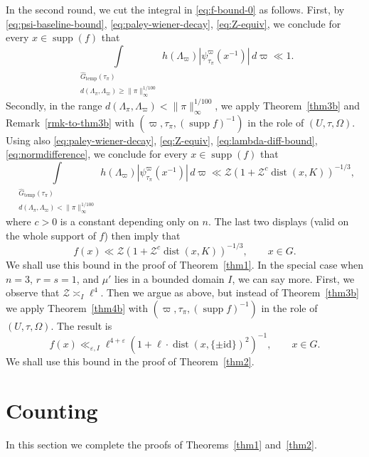 \documentclass[11pt,oneside]{amsart}
\numberwithin{equation}{section}
\theoremstyle{remark}
\theoremstyle{plain}
\DeclareMathOperator{\dist}{dist}
\DeclareMathOperator{\supp}{supp}
\newcommand\id{\mathrm{id}}
\newcommand{\mcZ}{\mathcal{Z}}
\newcommand\eps{\varepsilon}
\renewcommand\geq{\geqslant}
\newcommand\Gtemp{\widehat{G}_\mathrm{temp}}
\begin{document}
In the second round, we cut the integral in \eqref{eq:f-bound-0} as follows. First, by \eqref{eq:psi-baseline-bound}, \eqref{eq:paley-wiener-decay}, \eqref{eq:Z-equiv}, we conclude for every $x\in\supp(f)$ that
\[
\int\limits_{\substack{\Gtemp(\tau_{\pi}) \\ d(\Lambda_{\pi},\Lambda_{\varpi}) \geq \|\pi\|_{\infty}^{1/100}}} h(\Lambda_{\varpi}) |\psi_{\tau_{\pi}}^{\varpi}(x^{-1})| \,d\varpi\ll 1.
\]
Secondly, in the range $d(\Lambda_{\pi},\Lambda_{\varpi}) < \|\pi\|_{\infty}^{1/100}$, we apply Theorem~\ref{thm3b} and Remark~\ref{rmk-to-thm3b} with $(\varpi,\tau_\pi,(\supp f)^{-1})$ in the role of $(U,\tau,\Omega)$. Using also \eqref{eq:paley-wiener-decay}, \eqref{eq:Z-equiv}, \eqref{eq:lambda-diff-bound}, \eqref{eq:normdifference}, we conclude for every $x\in\supp(f)$ that
\[
\int\limits_{\substack{\Gtemp(\tau_{\pi}) \\ d(\Lambda_{\pi},\Lambda_{\varpi}) < \|\pi\|_{\infty}^{1/100}}} h(\Lambda_{\varpi}) |\psi_{\tau_{\pi}}^{\varpi}(x^{-1})| \,d\varpi \ll \mcZ(1+\mcZ^c \dist(x,K))^{-1/3},
\]
where $c>0$ is a constant depending only on $n$. The last two displays (valid on the whole support of $f$) then imply that
\begin{equation}\label{eq:f-decay}
f(x)\ll \mcZ \left(1+\mcZ^{c}\dist(x,K)\right)^{-1/3},\qquad x\in G.
\end{equation}
We shall use this bound in the proof of Theorem~\ref{thm1}. In the special case when $n=3$, $r=s=1$, and $\mu'$ lies in a bounded domain $I$, we can say more. First, we observe that $\mcZ\asymp_I \ell^4$. Then we argue as above, but instead of Theorem~\ref{thm3b} we apply Theorem~\ref{thm4b} with $(\varpi,\tau_\pi,(\supp f)^{-1})$ in the role of $(U,\tau,\Omega)$. The result is
\begin{equation}\label{eq:f-decay-2}
f(x) \ll_{\eps,I} \ell^{4+\eps} (1 + \ell \cdot \dist(x, \{\pm \id\})^2 )^{-1}, \qquad x\in G.
\end{equation}
We shall use this bound in the proof of Theorem~\ref{thm2}.

\section{Counting}\label{counting}
In this section we complete the proofs of Theorems~\ref{thm1} and~\ref{thm2}.
\end{document}
